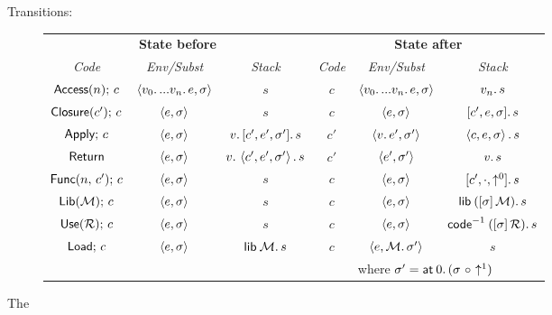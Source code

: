 \documentclass[11pt]{article}
\begin{document}
\begin{figure}
\begin{description}
  \item[Transitions:]\hfill

  \begin{tabular}{ccc|ccc}
    \multicolumn{3}{c|}{\bf State before} &
    \multicolumn{3}{c}{\bf State after}\\
    \it Code & \it Env/Subst & \it Stack &
    \it Code & \it Env/Subst & \it Stack\\\hline
    $\textsf{Access}(n);\, c$ & $\left\langle v_0 .\, ... v_n .\, e, \sigma\right\rangle$ & $s$ &
    $c$ & $\left\langle v_0 .\, ... v_n .\, e, \sigma\right\rangle$ & $v_n .\, s$\\
    $\textsf{Closure}(c');\, c$ & $\left\langle e,\sigma\right\rangle$ & $s$ &
    $c$ & $\left\langle e,\sigma\right\rangle$ & $[c',e,\sigma] .\, s$\\
    $\textsf{Apply};\, c$ & $\left\langle e,\sigma\right\rangle$ & $v .\, [c', e',\sigma'] .\, s$ &
    $c'$ & $\left\langle v .\, e',\sigma'\right\rangle$ & $\left\langle c, e, \sigma\right\rangle .\, s$\\
    $\textsf{Return}$ & $\left\langle e,\sigma\right\rangle$ & $v .\, \left\langle c',e',\sigma'\right\rangle .\, s$ &
    $c'$ & $\left\langle e',\sigma'\right\rangle$ & $v .\, s$\\
    $\textsf{Func}({n},\,{c'});\, c$ & $\left\langle e,\sigma\right\rangle$ & $s$ &
    $c$ & $\left\langle e,\sigma\right\rangle$ & $[c', \cdot, {\uparrow^{0}}] .\, s$\\
    $\textsf{Lib}(\mathcal{M});\, c$ & $\left\langle e,\sigma\right\rangle$ & $s$ &
    $c$ & $\left\langle e,\sigma\right\rangle$ & $\textsf{lib}\:{([{\sigma}]\,{\mathcal{M}})} .\, s$\\
    $\textsf{Use}(\mathcal{R});\, c$ & $\left\langle e,\sigma\right\rangle$ & $s$ &
    $c$ & $\left\langle e,\sigma\right\rangle$ & $\textsf{code}^{-1}\:([{\sigma}]\,{\mathcal{R}}) .\, s$\\
    $\textsf{Load};\, c$ & $\left\langle e,\sigma\right\rangle$ & $\textsf{lib}\:{\mathcal{M}}.\, s$ &
    $c$ & $\left\langle e, \mathcal{M} .\, \sigma'\right\rangle$ & $s$\\
    &&&&\multicolumn{2}{l}{where $\sigma' = \textsf{at}\:{0} .\, (\sigma ~{\circ}~ {\uparrow^{1}})$}
  \end{tabular}

  \end{description}

  \caption{The \camlib{}}
  \label{fig:camlib}
\end{figure}
\end{document}
